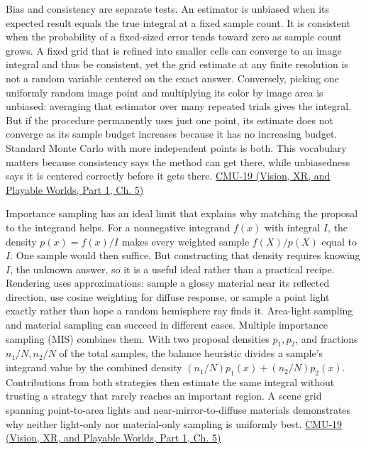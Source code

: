 Bias and consistency are separate tests. An estimator is unbiased when its expected result equals the true integral at a fixed sample count. It is consistent when the probability of a fixed-sized error tends toward zero as sample count grows. A fixed grid that is refined into smaller cells can converge to an image integral and thus be consistent, yet the grid estimate at any finite resolution is not a random variable centered on the exact answer. Conversely, picking one uniformly random image point and multiplying its color by image area is unbiased: averaging that estimator over many repeated trials gives the integral. But if the procedure permanently uses just one point, its estimate does not converge as its sample budget increases because it has no increasing budget. Standard Monte Carlo with more independent points is both. This vocabulary matters because consistency says the method can get there, while unbiasedness says it is centered correctly before it gets there. \href{../07-Vision-XR-and-Playable-Worlds-P01/main.pdf\#nameddest=04-visual-computing-ii-ch036-cmu-19---variance-reduction}{CMU-19 (Vision, XR, and Playable Worlds, Part 1, Ch. 5)}

Importance sampling has an ideal limit that explains why matching the proposal to the integrand helps. For a nonnegative integrand \(f(x)\) with integral \(I\), the density \(p(x)=f(x)/I\) makes every weighted sample \(f(X)/p(X)\) equal to \(I\). One sample would then suffice. But constructing that density requires knowing \(I\), the unknown answer, so it is a useful ideal rather than a practical recipe. Rendering uses approximations: sample a glossy material near its reflected direction, use cosine weighting for diffuse response, or sample a point light exactly rather than hope a random hemisphere ray finds it. Area-light sampling and material sampling can succeed in different cases. Multiple importance sampling (MIS) combines them. With two proposal densities \(p_1,p_2\), and fractions \(n_1/N,n_2/N\) of the total samples, the balance heuristic divides a sample's integrand value by the combined density \((n_1/N)p_1(x)+(n_2/N)p_2(x)\). Contributions from both strategies then estimate the same integral without trusting a strategy that rarely reaches an important region. A scene grid spanning point-to-area lights and near-mirror-to-diffuse materials demonstrates why neither light-only nor material-only sampling is uniformly best. \href{../07-Vision-XR-and-Playable-Worlds-P01/main.pdf\#nameddest=04-visual-computing-ii-ch036-cmu-19---variance-reduction}{CMU-19 (Vision, XR, and Playable Worlds, Part 1, Ch. 5)}

